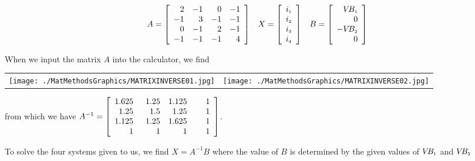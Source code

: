 \documentclass{ximera}
\begin{document}
\begin{example}
\[\begin{array}{ccc}
A = \left[ \begin{array}{rrrr} 2 & -1 & 0 & -1  \\ -1 & 3 & -1 & -1 \\ 0 & -1 & 2 & -1 \\ -1 & -1 & -1 & 4 \end{array} \right] 

&

 X = \left[ \begin{array}{r} i_{\mbox{\tiny$1$}} \\ i_{\mbox{\tiny$2$}} \\ i_{\mbox{\tiny$3$}} \\ i_{\mbox{\tiny$4$}} \\ \end{array} \right]
 
&

 B = \left[ \begin{array}{r} V\!B_{\mbox{\tiny$1$}} \\ 0 \\ -V\!B_{\mbox{\tiny$2$}} \\ 0 \end{array} \right] 
 \end{array}\]   

When we input the matrix $A$ into the calculator, we find

\begin{center}

\begin{tabular}{cc}

\texttt{[image: ./MatMethodsGraphics/MATRIXINVERSE01.jpg]} &

\hspace{0.75in} \texttt{[image: ./MatMethodsGraphics/MATRIXINVERSE02.jpg]}  \\

\end{tabular}

\end{center}

from which we have  $A^{-1} = \left[ \begin{array}{rrrr} 1.625 & \hphantom{2}1.25 & 1.125 & \hphantom{2.2}1  \\ 1.25 & 1.5 & 1.25 & 1 \\ 1.125 & 1.25 & 1.625 & 1 \\ 1 & 1 & 1 & 1 \end{array} \right]$. 

To solve the four systems given to us, we find $X=A^{-1}B$ where the value of $B$ is determined by the given values of $V\!B_{\mbox{\tiny$1$}}$ and $V\!B_{\mbox{\tiny$2$}}$


\end{example}
\end{document}
